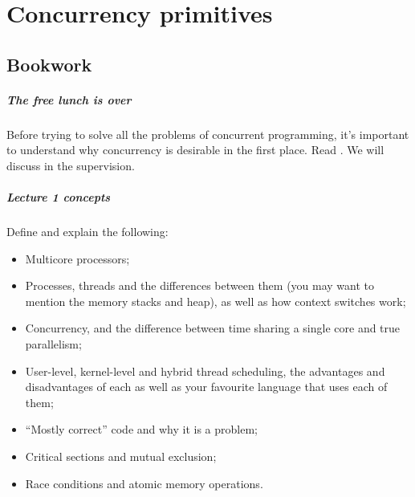 \documentclass[12pt,a4paper,oneside,openright]{report}
\newcommand{\question}[2]{\paragraph{#1} #2}
\begin{document}
\chapter{Concurrency primitives}
\pagestyle{headings} 

\section{Bookwork}

\question{The free lunch is over}{Before trying to solve all the
  problems of concurrent programming, it's important to understand why
  concurrency is desirable in the first place. Read
  \cite{FreeLunchIsOver}. We will discuss in the supervision.}

\question{Lecture 1 concepts}{Define and explain the following:
  \begin{itemize}
  \item Multicore processors;
  \item Processes, threads and the differences between them (you may
    want to mention the memory stacks and heap), as well as how
    context switches work;
  \item Concurrency, and the difference between time sharing a single
    core and true parallelism;
  \item User-level, kernel-level and hybrid thread scheduling, the
    advantages and disadvantages of each as well as your favourite
    language that uses each of them;
  \item ``Mostly correct'' code and why it is a problem;
  \item Critical sections and mutual exclusion;
  \item Race conditions and atomic memory operations.
  \end{itemize}
}
\end{document}
